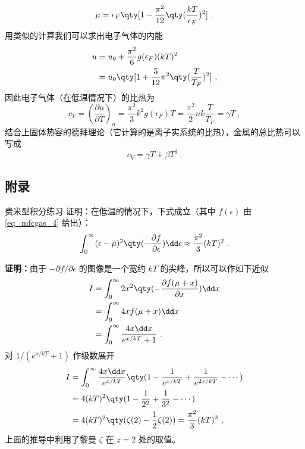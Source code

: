 \begin{equation}
\mu=\epsilon_F\qty[1-\frac{\pi^2}{12}\qty(\frac{kT}{\epsilon_F})^2]~.
\end{equation}
用类似的计算我们可以求出电子气体的内能
\begin{equation}
\begin{aligned}
u&=u_0+\frac{\pi^2}{6}g(\epsilon_F)(kT)^2\\
&=u_0\qty[1+\frac{5}{12}\pi^2\qty(\frac{T}{T_F})^2]~,
\end{aligned}
\end{equation}
因此电子气体（在低温情况下）的比热为
\begin{equation}
c_V=\left(\frac{\partial u}{\partial T}\right)_n=\frac{\pi^2}{3}k^2 g(\epsilon_F) T =\frac{\pi^2}{2}nk\frac{T}{T_F}= \gamma T~,
\end{equation}
结合上固体热容的德拜理论（它计算的是离子实系统的比热），金属的总比热可以写成
\begin{equation}
c_V=\gamma T+\beta T^3~.
\end{equation}
\subsection{附录}
\begin{lemma}{费米型积分练习}\label{lem_mfcgas_1}
证明：在低温的情况下，下式成立（其中 $f(\epsilon)$ 由 \autoref{eq_mfcgas_4} 给出）：
\begin{equation}
\int_0^\infty (\epsilon-\mu)^2 \qty(-\frac{\partial f}{\partial \epsilon})\dd\epsilon
\approx\frac{\pi^2}{3}(kT)^2~.
\end{equation}


\textbf{证明：}由于 $-\partial f/\partial \epsilon$ 的图像是一个宽约 $k T$ 的尖峰，所以可以作如下近似
\begin{equation}
\begin{aligned}
I&=\int_0^\infty 2x^2 \qty(-\frac{\partial f(\mu+x)}{\partial x}) \dd x\\
&=\int_0^\infty 4x f(\mu+x) \dd x\\
&=\int_0^\infty \frac{4x\dd x}{e^{x/kT}+1}~.
\end{aligned}
\end{equation}
对 $1/(e^{x/kT}+1)$ 作级数展开
\begin{equation}
\begin{aligned}
I&=\int_0^\infty \frac{4x\dd x}{e^{x/kT}}\qty(1-\frac{1}{e^{x/kT}}+\frac{1}{e^{2x/kT}}-\cdots)\\
&=4(kT)^2 \qty(1-\frac{1}{2^2}+\frac{1}{3^2}-\cdots)\\
&=4(kT)^2 \qty(\zeta(2)-\frac{1}{2}\zeta(2))=\frac{\pi^2}{3}(kT)^2~,
\end{aligned}
\end{equation}
上面的推导中利用了黎曼 $\zeta$ 在 $z=2$ 处的取值。
\end{lemma}

